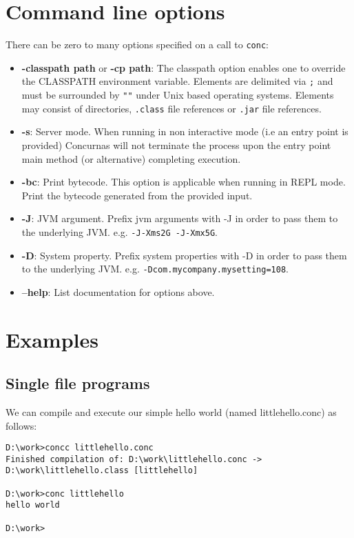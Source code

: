 \documentclass[conc-doc]{subfiles}
\begin{document}
\section{Command line options}
\label{sec:cmdlineparams}
There can be zero to many options specified on a call to \lstinline[language=None]{conc}:
\begin{itemize}
	\item \textbf{-classpath path} or \textbf{-cp path}: The classpath option enables one to override the CLASSPATH environment variable. Elements are delimited via \lstinline[language=None]{;} and must be surrounded by \lstinline[language=None]{""} under Unix based operating systems. Elements may consist of directories, \lstinline{.class} file references or \lstinline{.jar} file references.
	\item \textbf{-s}: Server mode. When running in non interactive mode (i.e an entry point is provided) Concurnas will not terminate the process upon the entry point main method (or alternative) completing execution.
	\item \textbf{-bc}: Print bytecode. This option is applicable when running in REPL mode. Print the bytecode generated from the provided input.
	\item \textbf{-J}: JVM argument. Prefix jvm arguments with -J in order to pass them to the underlying JVM. e.g. \lstinline{-J-Xms2G -J-Xmx5G}.
	\item \textbf{-D}: System property. Prefix system properties with -D in order to pass them to the underlying JVM. e.g. \lstinline{-Dcom.mycompany.mysetting=108}.
	\item \textbf{--help}: List documentation for options above.
\end{itemize}



\section{Examples}
\subsection{Single file programs}
We can compile and execute our simple hello world (named littlehello.conc) as follows:

\begin{lstlisting}[language=None]
D:\work>concc littlehello.conc
Finished compilation of: D:\work\littlehello.conc -> D:\work\littlehello.class [littlehello]

D:\work>conc littlehello
hello world

D:\work>
\end{lstlisting}
\end{document}
